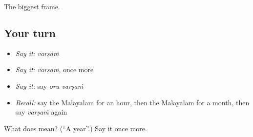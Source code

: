 \begin{grammarlens}[title={What you've built}]
The biggest frame.
\end{grammarlens}

\subsection*{Your turn}
\begin{itemize}
\raggedright
  \item \emph{Say it:} \emph{varṣaṁ}
  \item \emph{Say it:} \emph{varṣaṁ}, once more
  \item \emph{Say it:} say \emph{oru varṣaṁ}
  \item \emph{Recall:} say the Malayalam for an hour, then the Malayalam for a month, then say \emph{varṣaṁ} again
\end{itemize}

\begin{tcolorbox}[breakable,colback=teal!4,colframe=teal!35!black,title={Before you move on}]
What does  mean? (\textquotedblleft{}A year\textquotedblright{}.) Say it once more.
\end{tcolorbox}
